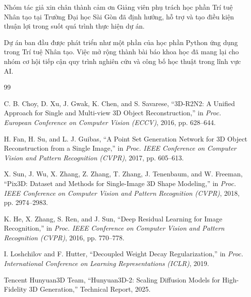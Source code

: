\documentclass[conference,a4paper]{IEEEtran}
\begin{document}
Nhóm tác giả xin chân thành cảm ơn Giảng viên phụ trách học phần Trí tuệ Nhân tạo tại Trường Đại học Sài Gòn đã định hướng, hỗ trợ và tạo điều kiện thuận lợi trong suốt quá trình thực hiện dự án.

Dự án ban đầu được phát triển như một phần của học phần Python ứng dụng trong Trí tuệ Nhân tạo. Việc mở rộng thành bài báo khoa học đã mang lại cho nhóm cơ hội tiếp cận quy trình nghiên cứu và công bố học thuật trong lĩnh vực AI.

\begin{thebibliography}{99}

C. B. Choy, D. Xu, J. Gwak, K. Chen, and S. Savarese,
``3D-R2N2: A Unified Approach for Single and Multi-view 3D Object Reconstruction,''
in \textit{Proc. European Conference on Computer Vision (ECCV)},
2016, pp. 628--644.

H. Fan, H. Su, and L. J. Guibas,
``A Point Set Generation Network for 3D Object Reconstruction from a Single Image,''
in \textit{Proc. IEEE Conference on Computer Vision and Pattern Recognition (CVPR)},
2017, pp. 605--613.

X. Sun, J. Wu, X. Zhang, Z. Zhang, T. Zhang,
J. Tenenbaum, and W. Freeman,
``Pix3D: Dataset and Methods for Single-Image 3D Shape Modeling,''
in \textit{Proc. IEEE Conference on Computer Vision and Pattern Recognition (CVPR)},
2018, pp. 2974--2983.

K. He, X. Zhang, S. Ren, and J. Sun,
``Deep Residual Learning for Image Recognition,''
in \textit{Proc. IEEE Conference on Computer Vision and Pattern Recognition (CVPR)},
2016, pp. 770--778.

I. Loshchilov and F. Hutter,
``Decoupled Weight Decay Regularization,''
in \textit{Proc. International Conference on Learning Representations (ICLR)},
2019.

Tencent Hunyuan3D Team,
``Hunyuan3D-2: Scaling Diffusion Models for High-Fidelity 3D Generation,''
Technical Report,
2025.

\end{thebibliography}
\end{document}
